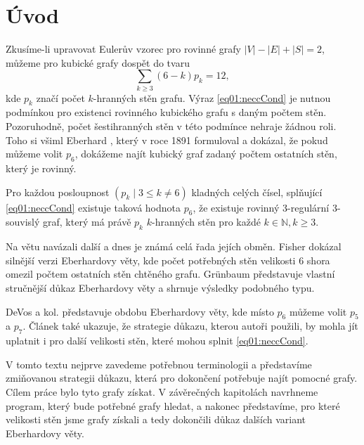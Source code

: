\chapter*{Úvod}

Zkusíme-li upravovat Eulerův vzorec pro rovinné grafy
$|V|-|E|+|S|=2$, můžeme pro kubické grafy dospět do tvaru 
\begin{equation}\label{eq01:neccCond}
\sum_{k \geq 3}{(6-k)p_k}=12,
\end{equation}
kde $p_k$ značí počet $k$-hranných stěn grafu. Výraz \eqref{eq01:neccCond} je nutnou podmínkou pro existenci rovinného kubického grafu s daným počtem stěn. Pozoruhodně, počet šestihranných stěn v této podmínce nehraje žádnou roli. Toho si všiml Eberhard \cite{Eberhard91}, který v roce 1891 formuloval a dokázal, že pokud můžeme volit $p_6$, dokážeme najít kubický graf zadaný počtem ostatních stěn, který je rovinný.

\begin{veta}\label{veta:Eberhard}
Pro každou posloupnost $(p_k \mid 3 \leq k \neq 6)$ kladných celých čísel, splňující \eqref{eq01:neccCond} existuje taková hodnota $p_6$, že existuje rovinný 3-regulární 3-souvislý graf, který má právě $p_k$ $k$-hranných stěn pro každé $k \in \mathbb{N}, k \geq 3 $.
\end{veta}

Na větu navázali další a dnes je známá celá řada jejích obměn. Fisher \cite{Fisher74} dokázal silnější verzi Eberhardovy věty, kde počet potřebných stěn velikosti 6 shora omezil počtem ostatních stěn chtěného grafu. Grünbaum \cite{Grunbaum} představuje vlastní stručnější důkaz Eberhardovy věty a shrnuje výsledky podobného typu. 

DeVos a kol. \cite{Samal09} představuje obdobu Eberhardovy věty, kde místo $p_6$ můžeme volit $p_5$ a $p_7$. Článek také ukazuje, že strategie důkazu, kterou autoři použili, by mohla jít uplatnit i pro další velikosti stěn, které mohou splnit \eqref{eq01:neccCond}. 

V tomto textu nejprve zavedeme potřebnou terminologii a představíme zmiňovanou strategii důkazu, která pro dokončení potřebuje najít pomocné grafy. Cílem práce bylo tyto grafy získat. V závěrečných kapitolách navrhneme program, který bude potřebné grafy hledat, a nakonec představíme, pro které velikosti stěn jsme grafy získali a tedy dokončili důkaz dalších variant Eberhardovy věty.

